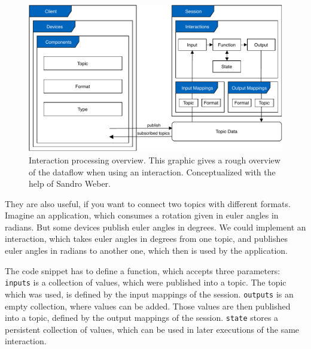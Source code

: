 \begin{figure}[htpb]
  \centering
  \includegraphics[width=12cm]{figures/ubii_cd.pdf}
  \caption[UBII Communication Diagram]{Interaction processing overview. This graphic gives a rough overview of the dataflow when using an interaction. Conceptualized with the help of Sandro Weber.}\label{fig:ubii_cd}
\end{figure}

They are also useful, if you want to connect two topics with different formats. Imagine an application, which consumes a rotation given in euler angles in radians. But some devices publish euler angles in degrees. We could implement an interaction, which takes euler angles in degrees from one topic, and publishes euler angles in radians to another one, which then is used by the application.

The code snippet has to define a function, which accepts three parameters: 
\lstinline{inputs} is a collection of values, which were published into a topic. The topic which was used, is defined by the input mappings of the session. \lstinline{outputs} is an empty collection, where values can be added. Those values are then published into a topic, defined by the output mappings of the session. \lstinline{state} stores a persistent collection of values, which can be used in later executions of the same interaction.

